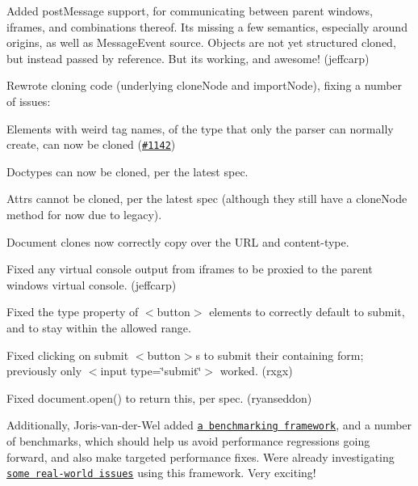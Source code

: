 \begin{DoxyItemize}
\item Added {\ttfamily post\+Message} support, for communicating between parent windows, iframes, and combinations thereof. It\textquotesingle{}s missing a few semantics, especially around origins, as well as Message\+Event source. Objects are not yet structured cloned, but instead passed by reference. But it\textquotesingle{}s working, and awesome! (jeffcarp)
\item Rewrote cloning code (underlying {\ttfamily clone\+Node} and {\ttfamily import\+Node}), fixing a number of issues\+:
\begin{DoxyItemize}
\item Elements with weird tag names, of the type that only the parser can normally create, can now be cloned (\href{https://github.com/tmpvar/jsdom/issues/1142}{\tt \#1142})
\item Doctypes can now be cloned, per the latest spec.
\item Attrs cannot be cloned, per the latest spec (although they still have a {\ttfamily clone\+Node} method for now due to legacy).
\item Document clones now correctly copy over the U\+RL and content-\/type.
\end{DoxyItemize}
\item Fixed any virtual console output from iframes to be proxied to the parent window\textquotesingle{}s virtual console. (jeffcarp)
\item Fixed the {\ttfamily type} property of {\ttfamily $<$button$>$} elements to correctly default to {\ttfamily submit}, and to stay within the allowed range.
\item Fixed clicking on submit {\ttfamily $<$button$>$}s to submit their containing form; previously only {\ttfamily $<$input type=\char`\"{}submit\char`\"{}$>$} worked. (rxgx)
\item Fixed {\ttfamily document.\+open()} to return {\ttfamily this}, per spec. (ryanseddon)
\end{DoxyItemize}

Additionally, Joris-\/van-\/der-\/\+Wel added \href{https://github.com/tmpvar/jsdom/blob/master/Contributing.md#running-the-benchmarks}{\tt a benchmarking framework}, and a number of benchmarks, which should help us avoid performance regressions going forward, and also make targeted performance fixes. We\textquotesingle{}re already investigating \href{https://github.com/tmpvar/jsdom/issues/1156}{\tt some real-\/world issues} using this framework. Very exciting!

